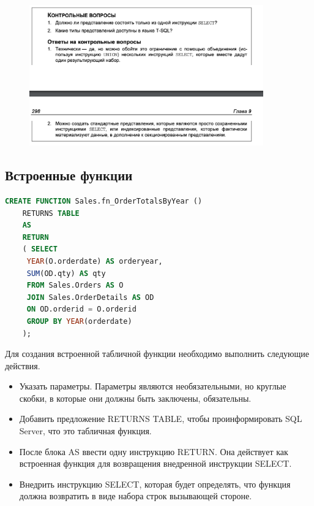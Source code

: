 \begin{figure}[h!]
	\begin{center}
		\includegraphics[width=0.9\textwidth]{img/control18.png}
	\end{center}
	\captionsetup{justification=centering}
\end{figure}


\subsection{Встроенные функции}

\begin{lstlisting}[label=lst:funcReturn, language=sql]
	CREATE FUNCTION Sales.fn_OrderTotalsByYear ()
	RETURNS TABLE
	AS
	RETURN
	( SELECT
	 YEAR(O.orderdate) AS orderyear,
	 SUM(OD.qty) AS qty
	 FROM Sales.Orders AS O
	 JOIN Sales.OrderDetails AS OD
	 ON OD.orderid = O.orderid
	 GROUP BY YEAR(orderdate)
	); 
\end{lstlisting}

Для создания встроенной табличной функции необходимо выполнить следующие
действия. 

\begin{itemize}
	\item Указать параметры. Параметры являются необязательными, но круглые скобки,
	в которые они должны быть заключены, обязательны. 
	\item Добавить предложение RETURNS TABLE, чтобы проинформировать SQL Server, что
	это табличная функция. 
	\item После блока AS ввести одну инструкцию RETURN. Она действует как встроенная
	функция для возвращения внедренной инструкции SELECT. 
	\item Внедрить инструкцию SELECT, которая будет определять, что функция должна
	возвратить в виде набора строк вызывающей стороне. 
\end{itemize}


